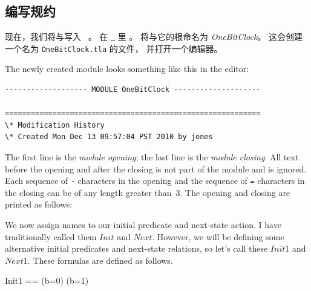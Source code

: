 \begin{ch}
  \subsection{编写规约}

  现在，我们将\tlainitpredicate{}与\tlanextstateaction{}写入 \tlaplus\ \tlaspec。
  在%
  \hyperref{http://research.microsoft.com/en-us/um/people/lamport/tla/toolbox.html}{}{}{\protect\tlaplus\ \tlatoolbox}%
  里%
  。
  将\tlaspec{}与它的根\tlamodule{}命名为 \emph{OneBitClock}。
  这会创建一个名为 \texttt{OneBitClock.tla} 的\tlamodule{}文件，
  并打开一个编辑器。
\end{ch}

\begin{en}
The newly created module looks something like this in the editor:
\begin{display}
\begin{verbatim}
------------------- MODULE OneBitClock --------------------

===========================================================
\* Modification History
\* Created Mon Dec 13 09:57:04 PST 2010 by jones
\end{verbatim}
\end{display}
The first line is the 
\emph{module opening}; the last line is the
\emph{module closing}.  All text before the opening and after the
closing is not part of the module and is ignored.  Each sequence of
\verb|-| characters in the opening and the sequence of \verb|=|
characters in the closing can be of any length greater than~3.  
The opening and closing are printed as follows:
\begin{display}
\end{display}
We now assign names to our initial predicate and next-state action.  I
have traditionally called them $Init$ and $Next$.  However, we will be
defining some alternative initial predicates and next-state relations,
so let's call these $Init1$ and $Next1$.  These formulas are defined
as follows.
\begin{display}
\begin{notla}
Init1 == (b=0) \/ (b=1)
     

\end{notla}
\end{display}
\end{en}
